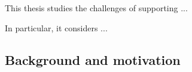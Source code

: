 










This thesis studies the challenges of supporting ...

In particular, it considers ...

\subsection{Background and motivation}

